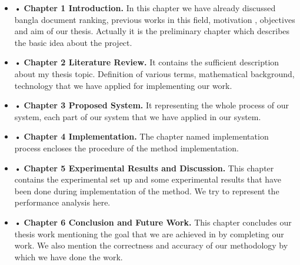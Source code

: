 \begin{itemize}

\item {•} \textbf{Chapter 1 Introduction.} In this chapter we have already discussed bangla document ranking, previous works in this field, motivation , objectives and aim of our thesis. Actually it is the preliminary chapter which describes the basic idea about the project. 

\item {•} \textbf{Chapter 2 Literature Review.} It contains the sufficient description about my thesis topic. Definition of various terms, mathematical background, technology that we have applied for implementing our work. 

\item {•} \textbf{Chapter 3 Proposed System.} It representing the whole process of our system, each part of our system that we have applied in our system.  

\item {•} \textbf{Chapter 4 Implementation.} The chapter named implementation process encloses  the  procedure  of  the  method  implementation.

\item {•} \textbf{Chapter 5 Experimental Results and Discussion.} This chapter contains the experimental set up and some experimental results that have been done during implementation of the method. We try to represent the performance analysis here.

\item {•} \textbf{Chapter 6 Conclusion and Future Work.} This chapter concludes our thesis work mentioning the goal that we are achieved in by completing our work. We also mention the correctness and accuracy of our methodology by which we have done the work.

\end{itemize} 
%
